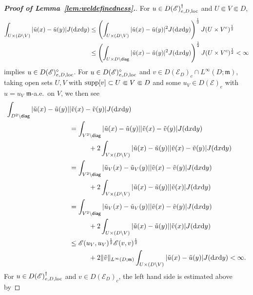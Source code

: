 \documentclass[12pt,a4paper]{article}
\renewcommand{\d}{\mathrm{d}}
\newcommand{\m}{\mathfrak{m} }
\newcommand{\loc}{{\rm loc}}
\newcommand{\1}{{\bf 1}}
\begin{document}
\begin{proof}[{\bf Proof of Lemma~\ref{lem:weldefinedness}.}]
For $u\in D(\mathscr{E})_{e,D,\loc}^{\dag}$ and $U\Subset V\Subset D$,
\begin{align*}
\int_{U\times (D\setminus V)}|\tilde{u}(x)-\tilde{u}(y)|J({\d} x{\d} y)&
\leq \left(\int_{U\times (D\setminus V)}|\tilde{u}(x)-\tilde{u}(y)|^2J({\d} x{\d} y) \right)^{\frac12}J(U\times V^c)^{\frac12}\\
&\leq \left(\int_{U\times D\setminus{\sf diag}}|\tilde{u}(x)-\tilde{u}(y)|^2J({\d} x{\d} y) \right)^{\frac12}J(U\times V^c)^{\frac12}<\infty
\end{align*}
implies $u\in D(\mathscr{E})_{e,D,\loc}^{\diamond}$.  
For $u\in D(\mathscr{E})_{e,D,\loc}^{\diamond}$ and $v\in D(\mathscr{E}_D)_c\cap L^{\infty}(D;{\m})$, taking open sets
$U,V$ with  ${\rm supp}[v]\subset U\Subset V\Subset D$ and some 
$u_V\in D(\mathscr{E})_e$ with $u=u_V$ ${\m}$-a.e.~on $V$, we then see 
\begin{align*}
\int_{D^2\setminus{\sf diag}}|\tilde{u}(x)-\tilde{u}(y)|&|\tilde{v}(x)-\tilde{v}(y)|J({\d} x{\d} y)\\
&
=\int_{V^2\setminus{\sf diag}}|\tilde{u}(x)-\tilde{u}(y)||\tilde{v}(x)-\tilde{v}(y)|J({\d} x{\d} y)\\
&\hspace{1cm}+2\int_{V\times (D\setminus V)}|\tilde{u}(x)-\tilde{u}(y)||\tilde{v}(x)-\tilde{v}(y)|J({\d} x{\d} y)\\
& = \int_{V^2\setminus {\sf diag}}|\tilde{u}_V(x)-\tilde{u}_V(y)||\tilde{v}(x)-\tilde{v}(y)|J({\d} x{\d} y)\\
&\hspace{1cm}+2\int_{V\times (D\setminus V)}|\tilde{u}(x)-\tilde{u}(y)||\tilde{v}(x)
|J({\d} x{\d} y)\\
&=\int_{V^2\setminus {\sf diag}}|\tilde{u}_V(x)-\tilde{u}_V(y)||\tilde{v}(x)-\tilde{v}(y)|J({\d} x{\d} y)\\
&\hspace{1cm}+2\int_{U\times (D\setminus V)}|\tilde{u}(x)-\tilde{u}(y)||\tilde{v}(x)
|J({\d} x{\d} y)\\
&\leq \mathscr{E}(u_V,u_V)^{\frac12}\mathscr{E}(v,v)^{\frac12}\\
&\hspace{1cm}+2\|\tilde{v}\|_{L^{\infty}(D;{\m})}
\int_{U\times (D\setminus V)}|\tilde{u}(x)-\tilde{u}(y)|J({\d} x{\d} y)<\infty.
\end{align*}
For $u\in D(\mathscr{E})_{e,D,\loc}^{\dag}$ and $v\in D(\mathscr{E}_D)_c$, the left hand side is estimated above by

\end{proof}
\end{document}
